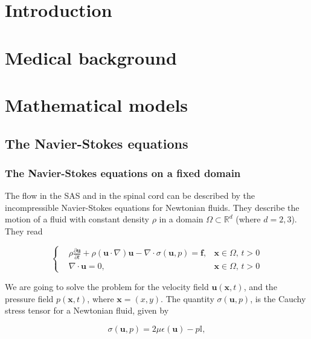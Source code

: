 \documentclass[11pt,a4paper,titlepage]{report}
\begin{document}

\tableofcontents
{}

\newpage


\chapter{Introduction}

\chapter{Medical background}

\chapter{Mathematical models}

\section{The Navier-Stokes equations}

\subsection{The Navier-Stokes equations on a fixed domain}


The flow in the SAS and in the spinal cord can be described by the incompressible Navier-Stokes equations for Newtonian fluids. They describe the motion of a fluid with constant density $\rho$ in a domain $\Omega \subset \mathbb{R}^d$ (where $d=2,3$). They read


\[
\left\{
\begin{aligned}
&\rho \frac{\partial \mathbf{u}}{\partial t} + \rho (\mathbf{u} \cdot \nabla)\mathbf{u} - \nabla \cdot \sigma(\mathbf{u},p) = \mathbf{f},  & \mathbf{x} \in \Omega, \, t>0 \\
& \nabla \cdot \mathbf{u} = 0, & \mathbf{x} \in \Omega, \, t>0
\end{aligned}
\right.
\]

We are going to solve the problem for the velocity field $\mathbf{u}(\mathbf{x},t)$, and the pressure field $p(\mathbf{x},t)$, where $\mathbf{x} = (x,y)$. The quantity $\sigma(\mathbf{u}, p)$, is the Cauchy stress tensor for a Newtonian fluid, given by

\[
\sigma(\mathbf{u}, p) = 2 \mu \epsilon(\mathbf{u}) - p \mathbb{I},
\]
\end{document}
